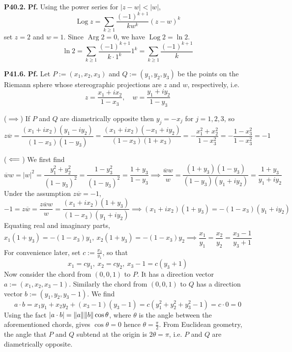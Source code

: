 \documentclass{article}
\def\tbf#1{\textbf{#1}}
\renewcommand{\th}{\theta}
\newcommand{\pf}{\tbf{Pf. }}
\newcommand{\imp}{\implies}
\newcommand{\impleft}{\reflectbox{$\implies$}}
\newcommand{\sep}[1][.5cm]{\vspace{#1}}
\renewcommand{\bar}{\overline}
\DeclareMathOperator{\Arg}{Arg}
\DeclareMathOperator{\Log}{Log}
\begin{document}
\tbf{P40.2.} \pf Using the power series for $|z-w|<|w|$,
$$\Log z = \sum_{k\ge1}\frac{(-1)^{k+1}}{kw^k}(z-w)^k$$
set $z=2$ and $w=1$. Since $\Arg 2=0$, we have $\Log 2=\ln 2$.
$$\ln 2 = \sum_{k\ge1}\frac{(-1)^{k+1}}{k\cdot 1^k}1^k = \sum_{k\ge1}\frac{(-1)^{k+1}}{k}$$
\sep



\tbf{P41.6.} \pf Let $P:=(x_1,x_2,x_3)$ and $Q:=(y_1,y_2,y_3)$ be the points on the Riemann sphere whose stereographic projections are $z$ and $w$, respectively, i.e.
$$z = \frac{x_1+ix_2}{1-x_3},
\quad w = \frac{y_1+iy_2}{1-y_3}$$

($\imp$) If $P$ and $Q$ are diametrically opposite then $y_j=-x_j$ for $j=1,2,3$, so
$$z\bar w = \frac{(x_1+ix_2)(y_1-iy_2)}{(1-x_3)(1-y_3)}
= \frac{(x_1+ix_2)(-x_1+iy_2)}{(1-x_3)(1+x_3)}
= -\frac{x_1^2+x_2^2}{1-x_3^2}
= -\frac{1-x_3^2}{1-x_3^2}
= -1$$

($\impleft$) We first find
$$\bar ww = |w|^2
= \frac{y_1^2+y_2^2}{(1-y_3)^2}
= \frac{1-y_3^2}{(1-y_3)^2}
= \frac{1+y_3}{1-y_3}
\imp \frac{\bar ww}{w} = \frac{(1+y_3)(1-y_3)}{(1-y_3)(y_1+iy_2)}
= \frac{1+y_3}{y_1+iy_2}$$
Under the assumption $z\bar w=-1$,
$$-1 = z\bar w = \frac{z\bar ww}{w}
= \frac{(x_1+ix_2)(1+y_3)}{(1-x_3)(y_1+iy_2)}
\imp (x_1+ix_2)(1+y_3) = -(1-x_3)(y_1+iy_2)$$
Equating real and imaginary parts,
$$x_1(1+y_3) = -(1-x_3)y_1,~x_2(1+y_3) = -(1-x_3)y_2
\imp \frac{x_1}{y_1} = \frac{x_2}{y_2} = \frac{x_3-1}{y_3+1}$$
For convenience later, set $c:=\frac{x_1}{y_1}$, so that
$$x_1 = cy_1,~x_2 = cy_2,~x_3-1 = c(y_3+1)$$
Now consider the chord from $(0,0,1)$ to $P$. It has a direction vector $a:=(x_1,x_2,x_3-1)$. Similarly the chord from $(0,0,1)$ to $Q$ has a direction vector $b:=(y_1,y_2,y_3-1)$. We find
$$a\cdot b = x_1y_1 + x_2y_2 + (x_3-1)(y_3-1) = c(y_1^2+y_2^2+y_3^2-1) = c\cdot0 = 0$$
Using the fact $|a\cdot b|=\norm{a}\norm{b}\cos\th$, where $\th$ is the angle between the aforementioned chords, gives $\cos\th=0$ hence $\th=\frac\pi2$. From Euclidean geometry, the angle that $P$ and $Q$ subtend at the origin is $2\th=\pi$, i.e. $P$ and $Q$ are diametrically opposite.

	
\end{document}
